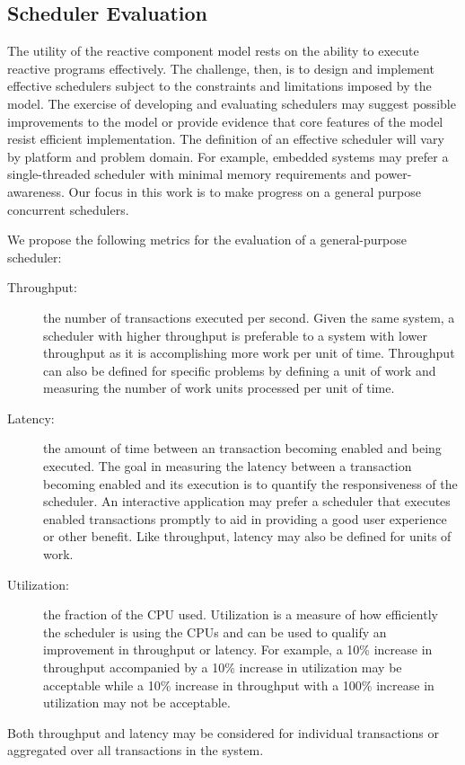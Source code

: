 \subsection{Scheduler Evaluation}

The utility of the reactive component model rests on the ability to execute reactive programs effectively.
The challenge, then, is to design and implement effective schedulers subject to the constraints and limitations imposed by the model.
The exercise of developing and evaluating schedulers may suggest possible improvements to the model or provide evidence that core features of the model resist efficient implementation.
The definition of an effective scheduler will vary by platform and problem domain.
For example, embedded systems may prefer a single-threaded scheduler with minimal memory requirements and power-awareness.
Our focus in this work is to make progress on a general purpose concurrent schedulers.

We propose the following metrics for the evaluation of a general-purpose scheduler:
\begin{description}
\item[Throughput:] the number of transactions executed per second.
Given the same system, a scheduler with higher throughput is preferable to a system with lower throughput as it is accomplishing more work per unit of time.
Throughput can also be defined for specific problems by defining a unit of work and measuring the number of work units processed per unit of time.
\item[Latency:] the amount of time between an transaction becoming enabled and being executed.
The goal in measuring the latency between a transaction becoming enabled and its execution is to quantify the responsiveness of the scheduler.
An interactive application may prefer a scheduler that executes enabled transactions promptly to aid in providing a good user experience or other benefit.
Like throughput, latency may also be defined for units of work.
\item[Utilization:] the fraction of the CPU used.
Utilization is a measure of how efficiently the scheduler is using the CPUs and can be used to qualify an improvement in throughput or latency.
For example, a 10\% increase in throughput accompanied by a 10\% increase in utilization may be acceptable while a 10\% increase in throughput with a 100\% increase in utilization may not be acceptable.
\end{description}
Both throughput and latency may be considered for individual transactions or aggregated over all transactions in the system.

